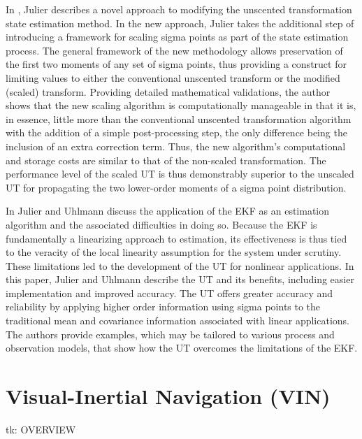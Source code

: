 In \cite{Julier2002}, Julier describes a novel approach to modifying the unscented transformation state estimation method. In the new approach, Julier takes the additional step of introducing a framework for scaling sigma points as part of the state estimation process. The general framework of the new methodology allows preservation of the first two moments of any set of sigma points, thus providing a construct for limiting values to either the conventional unscented transform or the modified (scaled) transform. Providing detailed mathematical validations, the author shows that the new scaling algorithm is computationally manageable in that it is, in essence, little more than the conventional unscented transformation algorithm with the addition of a simple post-processing step, the only difference being the inclusion of an extra correction term. Thus, the new algorithm's computational and storage costs are similar to that of the non-scaled transformation. The performance level of the scaled UT is thus demonstrably superior to the unscaled UT for propagating the two lower-order moments of a sigma point distribution.

In \cite{Julier2004} Julier and Uhlmann discuss the application of the EKF as an estimation algorithm and the associated difficulties in doing so. Because the EKF is fundamentally a linearizing approach to estimation, its effectiveness is thus tied to the veracity of the local linearity assumption for the system under scrutiny. These limitations led to the development of the UT for nonlinear applications. In this paper, Julier and Uhlmann describe the UT and its benefits, including easier implementation and improved accuracy. The UT offers greater accuracy and reliability by applying higher order information using sigma points to the traditional mean and covariance information associated with linear applications. The authors provide examples, which may be tailored to various process and observation models, that show how the UT overcomes the limitations of the EKF.

\section{Visual-Inertial Navigation (VIN)}

tk: OVERVIEW

